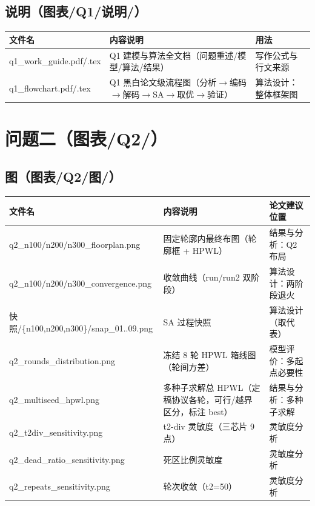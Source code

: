 \documentclass[12pt,a4paper]{article}
\begin{document}
\subsection{说明（图表/Q1/说明/）}

\begin{table}[H]
\centering
\scriptsize
\setlength{\tabcolsep}{1.5pt}
\begin{tabular}{>{\raggedright\arraybackslash}p{4.4cm}>{\raggedright\arraybackslash}p{7.6cm}>{\raggedright\arraybackslash}p{3.4cm}}
\toprule
文件名 & 内容说明 & 用法 \\
\midrule
q1\_\allowbreak{}work\_\allowbreak{}guide.pdf/.tex & Q1 建模与算法全文档（问题重述/模型/算法/结果） & 写作公式与行文来源 \\
q1\_\allowbreak{}flowchart.pdf/.tex & Q1 黑白论文级流程图（分析$\to$编码$\to$解码$\to$SA$\to$取优$\to$验证） & 算法设计：整体框架图 \\
\bottomrule
\end{tabular}
\end{table}

\section{问题二（图表/Q2/）}

\subsection{图（图表/Q2/图/）}

\begin{table}[H]
\centering
\scriptsize
\setlength{\tabcolsep}{1.5pt}
\begin{tabular}{>{\raggedright\arraybackslash}p{4.4cm}>{\raggedright\arraybackslash}p{7.6cm}>{\raggedright\arraybackslash}p{3.4cm}}
\toprule
文件名 & 内容说明 & 论文建议位置 \\
\midrule
q2\_\allowbreak{}n100/n200/n300\_\allowbreak{}floorplan.png & 固定轮廓内最终布图（轮廓框 + HPWL） & 结果与分析：Q2 布局 \\
q2\_\allowbreak{}n100/n200/n300\_\allowbreak{}convergence.png & 收敛曲线（run/run2 双阶段） & 算法设计：两阶段退火 \\
快照/\{n100,n200,n300\}/snap\_\allowbreak{}01..09.png & SA 过程快照 & 算法设计（取代表） \\
q2\_\allowbreak{}rounds\_\allowbreak{}distribution.png & 冻结 8 轮 HPWL 箱线图（轮间方差） & 模型评价：多起点必要性 \\
q2\_\allowbreak{}multiseed\_\allowbreak{}hpwl.png & 多种子求解总 HPWL（定稿协议各轮，可行/越界区分，标注 best） & 结果与分析：多种子求解 \\
q2\_\allowbreak{}t2div\_\allowbreak{}sensitivity.png & t2-div 灵敏度（三芯片 9 点） & 灵敏度分析 \\
q2\_\allowbreak{}dead\_\allowbreak{}ratio\_\allowbreak{}sensitivity.png & 死区比例灵敏度 & 灵敏度分析 \\
q2\_\allowbreak{}repeats\_\allowbreak{}sensitivity.png & 轮次收敛（t2=50） & 灵敏度分析 \\
\bottomrule
\end{tabular}
\end{table}
\end{document}
